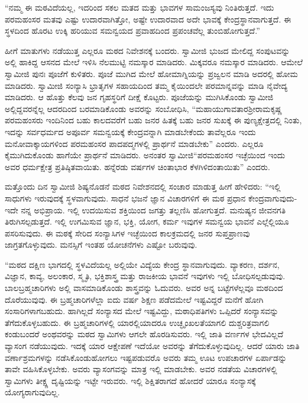 “ನಮ್ಮ ಈ ಮಠವಿದೆಯಲ್ಲ, ಇದರಿಂದ ಸಕಲ ಮತದ ಮತ್ತು ಭಾವಗಳ ಸಾಮಂಜಸ್ಯವು ನಿಂತಿರುತ್ತದೆ. ಇದು ಪರಮಹಂಸರ ಮತವು ಎಷ್ಟು ಉದಾರವಾಗಿತ್ತೋ, ಅಷ್ಟೇ ಉದಾರವಾದ ಅದೇ ಭಾವಕ್ಕೆ ಕೇಂದ್ರಸ್ಥಾನವಾಗುತ್ತದೆ. ಈ ಸ್ಥಳದಿಂದ ಹೊರಟ ಉಕ್ಕಿ ಹರಿಯುವ ಸಮನ್ವಯದ ಪ್ರವಾಹದಿಂದ ಪ್ರಪಂಚವೆಲ್ಲ ತುಂಬಿಹೋಗುತ್ತದೆ.” 

 ಹೀಗೆ ಮಾತುಗಳು ನಡೆಯುತ್ತ ಎಲ್ಲರೂ ಮಠದ ನಿವೇಶನಕ್ಕೆ ಬಂದರು. ಸ್ವಾಮೀಜಿ ಭುಜದ ಮೇಲಿದ್ದ ಸಂಪುಟವನ್ನು ಅಲ್ಲಿ ಹಾಕಿದ್ದ ಆಸನದ ಮೇಲೆ ಇಳಿಸಿ ನೆಲಮುಟ್ಟಿ ನಮಸ್ಕಾರ ಮಾಡಿದರು. ಮಿಕ್ಕವರೂ ನಮಸ್ಕಾರ ಮಾಡಿದರು. ಆಮೇಲೆ ಸ್ವಾಮೀಜಿ ಪುನಃ ಪೂಜೆಗೆ ಕುಳಿತರು. ಪೂಜೆ ಮುಗಿದ ಮೇಲೆ ಹೋಮಾಗ್ನಿಯನ್ನು ಪ್ರಜ್ವಲನ ಮಾಡಿ ಅದರಲ್ಲಿ ಹೋಮ ಮಾಡಿದರು. ಸ್ವಾಮೀಜಿ ಸಂನ್ಯಾಸಿ ಭ್ರಾತೃಗಳ ಸಹಾಯದಿಂದ ತಮ್ಮ ಕೈಯಿಂದಲೇ ಪರಮಾನ್ನವನ್ನು ಮಾಡಿ ನೈವೇದ್ಯ ಮಾಡಿದರು. ಆ ಹೊತ್ತು ಕೆಲವು ಜನ ಗೃಹಸ್ಥರಿಗೆ ದೀಕ್ಷೆ ಕೊಟ್ಟರು. ಪೂಜೆಯನ್ನು ಮುಗಿಸಿಕೊಂಡು ಸ್ವಾಮೀಜಿ ಅಲ್ಲಿದ್ದವರನ್ನೆಲ್ಲ ಆದರದಿಂದ ಬರಮಾಡಿಕೊಂಡು ಅವರನ್ನು ಸಂಬೋಧಿಸಿ, “ಮಹಾಯುಗಾವತಾರ\break ಶ‍್ರೀರಾಮಕೃಷ್ಣ ಪರಮಹಂಸರು ಇಂದಿನಿಂದ ಬಹು ಕಾಲದವರೆಗೆ ಬಹು ಜನರ ಹಿತಕ್ಕೆ ಬಹು ಜನರ ಸುಖಕ್ಕೆ ಈ ಪುಣ್ಯಕ್ಷೇತ್ರದಲ್ಲಿ ನಿಂತು, ಇದನ್ನು ಸರ್ವಧರ್ಮದ ಅಪೂರ್ವ ಸಮನ್ವಯಕ್ಕೆ ಕೇಂದ್ರವನ್ನಾಗಿ ಮಾಡಬೇಕೆಂದು ತಾವೆಲ್ಲರೂ ಇಂದು ಮನೋವಾಕ್ಕಾಯಗಳಿಂದ ಪರಮಹಂಸರ ಪಾದಪದ್ಮಗಳಲ್ಲಿ ಪ್ರಾರ್ಥನೆ ಮಾಡಬೇಕು” ಎಂದರು. ಎಲ್ಲರೂ ಕೈಮುಗಿದುಕೊಂಡು ಹಾಗೆಯೇ ಪ್ರಾರ್ಥನೆ ಮಾಡಿದರು. ಅನಂತರ ಸ್ವಾಮೀಜಿ\break “ಪರಮಹಂಸರ ಇಚ್ಛೆಯಿಂದ ಇಂದು ಅವರ ಧರ್ಮಕ್ಷೇತ್ರ ಪ್ರತಿಷ್ಠಿತವಾಯಿತು. ಹನ್ನೆರಡು ವರ್ಷಗಳ ಚಿಂತಾಭಾರ ಕೆಳಗಿಳಿದಂತಾಯಿತು” ಎಂದರು. 

 ಮತ್ತೊಂದು ದಿನ ಸ್ವಾಮೀಜಿ ಶಿಷ್ಯನೊಡನೆ ಮಠದ ನಿವೇಶನದಲ್ಲಿ ಸಂಚಾರ ಮಾಡುತ್ತ ಹೀಗೆ ಹೇಳಿದರು: “ಇಲ್ಲಿ ಸಾಧುಗಳು ಇರುವುದಕ್ಕೆ ಸ್ಥಳವಾಗುವುದು. ಸಾಧನೆ ಭಜನೆ ಜ್ಞಾನ ವಿಚಾರಗಳಿಗೆ ಈ ಮಠ ಪ್ರಧಾನ ಕೇಂದ್ರವಾಗುವುದು- ಇದೇ ನನ್ನ ಅಭಿಪ್ರಾಯ. ಇಲ್ಲಿ ಉದಯಿಸುವ ಶಕ್ತಿಯಿಂದ ಜಗತ್ತು ತಲ್ಲಣಿಸಿ ಹೋಗುತ್ತದೆ. ಮನುಷ್ಯನ ಜೀವನಗತಿ ತಿರುಗಿಸಲ್ಪಡುತ್ತದೆ. ಇಲ್ಲಿ ಉಗಮಿಸುವ ಜ್ಞಾನ, ಭಕ್ತಿ, ಯೋಗ, ಕರ್ಮ ಇವುಗಳ ಸಮನ್ವಯ ಭಾವನೆ ಎಲ್ಲೆಲ್ಲಿಯೂ ಪಸರಿಸುವುದು. ಈ ಮಠಕ್ಕೆ ಸೇರಿದ ಸಂನ್ಯಾಸಿಗಳ ಇಚ್ಛೆಯಿಂದ ಕಾಲಕ್ರಮದಲ್ಲಿ ಜನರ ಸುಪ್ತಪ್ರಾಣವು ಜಾಗ್ರತಗೊಳ್ಳುವುದು. ಮನಸ್ಸಿಗೆ ಇಂತಹ ಯೋಚನೆಗಳು ಎಷ್ಟೋ ಬರುವುವು. 

 “ಮಠದ ದಕ್ಷಿಣ ಭಾಗದಲ್ಲಿ ಸ್ಥಳವಿದೆಯಲ್ಲ ಅಲ್ಲಿಯೇ ವಿದ್ಯೆಯ ಕೇಂದ್ರ ಸ್ಥಾನವಾಗುವುದು. ವ್ಯಾಕರಣ, ದರ್ಶನ, ವಿಜ್ಞಾನ, ಕಾವ್ಯ, ಅಲಂಕಾರ, ಸ್ಮೃತಿ, ಭಕ್ತಿಶಾಸ್ತ್ರ ಮತ್ತು ರಾಜಕೀಯ ಭಾವನೆ ಇವುಗಳು ಇಲ್ಲಿ ಬೋಧಿಸಲ್ಪಡುವುವು. ಬಾಲಬ್ರಹ್ಮಚಾರಿಗಳು ಅಲ್ಲಿ ವಾಸಮಾಡಿಕೊಂಡು ಶಾಸ್ತ್ರವನ್ನು ಓದುವರು. ಅವರ ಅನ್ನ ಬಟ್ಟೆಗಳೆಲ್ಲವೂ ಮಠದಿಂದ ದೊರೆಯುವುವು. ಈ ಬ್ರಹ್ಮಚಾರಿಗಳೆಲ್ಲಾ ಐದು ವರ್ಷ ಶಿಕ್ಷಣ ಪಡೆದಮೇಲೆ ಇಷ್ಟವಿದ್ದರೆ ಮನೆಗೆ ಹೋಗಿ ಸಂಸಾರಿಗಳಾಗಬಹುದು. ಹಾಗಿಲ್ಲದೆ ಸಂನ್ಯಾಸದ ಮೇಲೆ ಇಷ್ಟವಿದ್ದು, ಮಠಾಧಿಪತಿಗಳು ಒಪ್ಪಿದರೆ ಸಂನ್ಯಾಸವನ್ನು ತೆಗೆದುಕೊಳ್ಳಬಹುದು. ಈ ಬ್ರಹ್ಮಚಾರಿಗಳಲ್ಲಿ ಯಾರಲ್ಲಿಯಾದರೂ ಉಚ್ಛೃಂಖಲತೆಯಾಗಲಿ ದುಶ್ಚರಿತ್ರವಾಗಲಿ ಕಂಡುಬಂದರೆ ಅಂಥವರನ್ನು ಮಠದ ಸ್ವಾಮಿಗಳು ಆಗಲೇ‌ ಹೊರಡಿಸುವರು. ಇಲ್ಲಿ ಜಾತಿ ವರ್ಣಗಳ ಭೇದವಿಲ್ಲದೆ ವ್ಯಾಸಂಗ ನಡೆಯುವುದು. ಇದಕ್ಕೆ ಯಾರ ಆಕ್ಷೇಪಣೆ ಇದೆಯೋ ಅವರನ್ನು ತೆಗೆದುಕೊಳ್ಳುವುದಿಲ್ಲ. ಆದರೆ ಯಾರು ಜಾತಿ ವರ್ಣಾಶ್ರಮಗಳನ್ನು ನಡೆಸಿಕೊಂಡುಹೋಗಲು ಇಷ್ಟಪಡುವರೊ ಅವರು ತಮ್ಮ ಊಟ ಉಪಚಾರಗಳ ಏರ್ಪಾಡನ್ನು ತಾವೇ ವಹಿಸಿಕೊಳ್ಳಬೇಕು. ಅವರು ವ್ಯಾಸಂಗವನ್ನು ಮಾತ್ರ ಇಲ್ಲಿ ಮಾಡಬೇಕು. ಅವರ ನಡತೆಯ ವಿಚಾರಗಳಲ್ಲಿ ಸ್ವಾಮಿಗಳು ತೀಕ್ಷ್ಣ ದೃಷ್ಟಿಯನ್ನು ಇಟ್ಟೇ ಇರುವರು. ಇಲ್ಲಿ ಶಿಕ್ಷಿತರಾಗದೆ ಹೋದರೆ ಯಾರೂ ಸಂನ್ಯಾಸಕ್ಕೆ ಯೋಗ್ಯರಾಗುವುದಿಲ್ಲ. 

